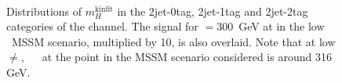 \begin{figure}[h!]
\begin{center}
~\\
\end{center}
\caption{Distributions of $m_{H}^{\text{kinfit}}$ in the 2jet-0tag, 2jet-1tag and 2jet-2tag categories 
of the \mutau channel. The \Htohhtobbtautau signal for \mA $= 300 $~GeV at  in the low \tanb~MSSM
scenario, multiplied by 10, is also overlaid. Note that at low \tanb \mA$\neq$\mH, ~\mH~ at the point
in the MSSM scenario considered is around 316 GeV.}
\label{fig:hhh_results_mhkinfit_mutau}
\end{figure}

